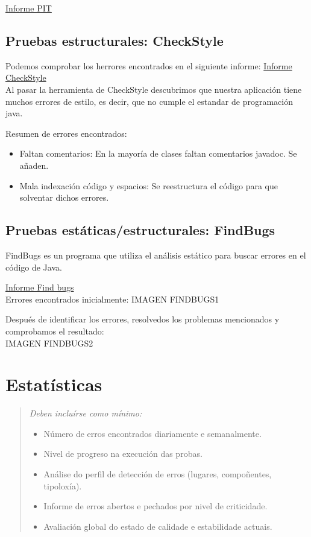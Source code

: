 \documentclass[DIV=calc,paper=a4,fontsize=11pt,onecolumn]{scrartcl} %
\newcommand{\hint}[1]{\begin{quote}\itshape #1 \end{quote}}
\begin{document}
	\href{Informes/pit-reports/index.html}{Informe PIT} \\
	
	\subsection{Pruebas estructurales: CheckStyle}
	Podemos comprobar los herrores encontrados en el siguiente informe: \href{Informes/SiteTestInicial/checkstyle.html}{Informe CheckStyle} \\
	Al pasar la herramienta de CheckStyle descubrimos que nuestra aplicación tiene muchos errores de estilo, es decir, que no cumple el estandar de programación java.
	
	Resumen de errores encontrados:
	\begin{itemize}
		\item Faltan comentarios: En la mayoría de clases faltan comentarios javadoc. Se añaden.
		\item Mala indexación código y espacios: Se reestructura el código para que solventar dichos errores.
	\end{itemize}
	

	\subsection{Pruebas estáticas/estructurales: FindBugs}
	
	FindBugs es un programa que utiliza el análisis estático para buscar errores en el código de Java.
	
	\href{Informes/SiteTestInicial/findbugs.html}{Informe Find bugs} \\
	
	Errores encontrados inicialmente:
	IMAGEN FINDBUGS1
	
	Después de identificar los errores, resolvedos los problemas mencionados y comprobamos el resultado:\\
	IMAGEN FINDBUGS2

\section{Estatísticas}

\hint{Deben incluírse como mínimo:
  \begin{itemize}
    \item Número de erros encontrados diariamente e semanalmente.
    \item Nivel de progreso na execución das probas.
    \item Análise do perfil de detección de erros (lugares, compoñentes, tipoloxía).
    \item Informe de erros abertos e pechados por nivel de criticidade.
    \item Avaliación global do estado de calidade e estabilidade actuais.
  \end{itemize}}
\end{document}
